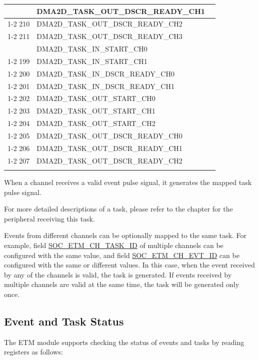 \documentclass[main\_\_EN.tex]{subfiles}
\begin{document}
\begin{longtable}{ | l | l | l | }
{209 & DMA2D\_TASK\_OUT\_DSCR\_READY\_CH1  & \\ \cline{1-2}
210 & DMA2D\_TASK\_OUT\_DSCR\_READY\_CH2  & \\ \cline{1-2}
211 & DMA2D\_TASK\_OUT\_DSCR\_READY\_CH3  & \\ \hline
}{%
198 & DMA2D\_TASK\_IN\_START\_CH0  & \nameref{mod:2ddma} \\ \cline{1-2}
199 & DMA2D\_TASK\_IN\_START\_CH1  & \\ \cline{1-2}
200 & DMA2D\_TASK\_IN\_DSCR\_READY\_CH0  & \\ \cline{1-2}
201 & DMA2D\_TASK\_IN\_DSCR\_READY\_CH1  & \\ \cline{1-2}
202 & DMA2D\_TASK\_OUT\_START\_CH0  & \\ \cline{1-2}
203 & DMA2D\_TASK\_OUT\_START\_CH1  & \\ \cline{1-2}
204 & DMA2D\_TASK\_OUT\_START\_CH2  & \\ \cline{1-2}
205 & DMA2D\_TASK\_OUT\_DSCR\_READY\_CH0  & \\ \cline{1-2}
206 & DMA2D\_TASK\_OUT\_DSCR\_READY\_CH1  & \\ \cline{1-2}
207 & DMA2D\_TASK\_OUT\_DSCR\_READY\_CH2  & \\ \hline
}
\end{longtable}

When a channel receives a valid event pulse signal, it generates the mapped task pulse signal.

For more detailed descriptions of a task, please refer to the chapter for the peripheral receiving this task.

Events from different channels can be optionally mapped to the same task. For example, field \hyperref[fielddesc:SOCETMCH0TASKID]{SOC\_ETM\_CH\_TASK\_ID} of multiple channels can be configured with the same value, and field \hyperref[fielddesc:SOCETMCH0EVTID]{SOC\_ETM\_CH\_EVT\_ID} can be configured with the same or different values. In this case, when the event received by any of the channels is valid, the task is generated. If events received by multiple channels are valid at the same time, the task will be generated only once.

\subsection{Event and Task Status}

The ETM module supports checking the status of events and tasks by reading registers as follows:
\end{document}

